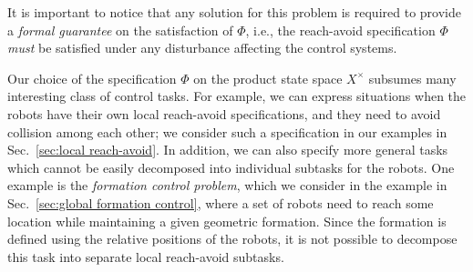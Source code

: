 \begin{comment}
\begin{description}
	\item[Inputs:] Control systems $\Sigma^i=(X^i,x_\init^i,U^i,W^i,f^i)$, $i\in [1;N]$, and the global specification $\Phi=\lnot\avoid\,\mathcal{U}\,\goal$.%
	\item[Parameters:] A robustness margin $\varepsilon\in \reals^n_{>0}$.%
	\item[Output:] Local feedback controllers $\set{C^i}$ for $\set{\Sigma^i}$, $i\in [1;N]$, such that $\set{C^i}\parallel \set{\Sigma^i}$ realizes $\Phi$. 
\end{description}
\end{comment}

It is important to notice that any solution for this problem is required to provide a \emph{formal guarantee} on the satisfaction of $\Phi$, 
i.e., the reach-avoid specification $\Phi$ \emph{must} be satisfied under any disturbance affecting the control systems.

Our choice of the specification $\Phi$ on the product state space $X^\times$ subsumes many interesting class of control tasks.
For example, we can express situations when the robots have their own local reach-avoid specifications, and they need to avoid collision among each other; we consider such a specification in our examples in Sec.~\ref{sec:local reach-avoid}.
In addition, we can also specify more general tasks which cannot be easily decomposed into individual subtasks for the robots.
One example is the \emph{formation control problem}, which we consider in the example in Sec.~\ref{sec:global formation control}, where a set of robots need to reach some location while maintaining a given geometric formation. Since the formation is defined using the relative positions of the robots, it is not possible to decompose this task into separate local reach-avoid subtasks.


